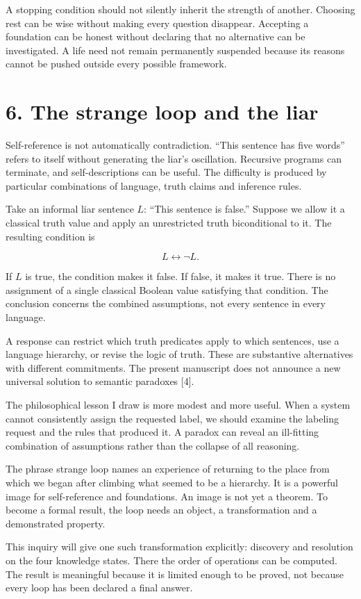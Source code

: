 \documentclass[10pt]{article}
\begin{document}
A stopping condition should not silently inherit the strength of another. Choosing rest can be wise without making every question disappear. Accepting a foundation can be honest without declaring that no alternative can be investigated. A life need not remain permanently suspended because its reasons cannot be pushed outside every possible framework.

\clearpage
\section*{6. The strange loop and the liar}
Self-reference is not automatically contradiction. ``This sentence has five words'' refers to itself without generating the liar's oscillation. Recursive programs can terminate, and self-descriptions can be useful. The difficulty is produced by particular combinations of language, truth claims and inference rules.

Take an informal liar sentence $L$: ``This sentence is false.'' Suppose we allow it a classical truth value and apply an unrestricted truth biconditional to it. The resulting condition is

\[
L\leftrightarrow\neg L.
\]

If $L$ is true, the condition makes it false. If false, it makes it true. There is no assignment of a single classical Boolean value satisfying that condition. The conclusion concerns the combined assumptions, not every sentence in every language.

A response can restrict which truth predicates apply to which sentences, use a language hierarchy, or revise the logic of truth. These are substantive alternatives with different commitments. The present manuscript does not announce a new universal solution to semantic paradoxes [4].

The philosophical lesson I draw is more modest and more useful. When a system cannot consistently assign the requested label, we should examine the labeling request and the rules that produced it. A paradox can reveal an ill-fitting combination of assumptions rather than the collapse of all reasoning.

The phrase strange loop names an experience of returning to the place from which we began after climbing what seemed to be a hierarchy. It is a powerful image for self-reference and foundations. An image is not yet a theorem. To become a formal result, the loop needs an object, a transformation and a demonstrated property.

This inquiry will give one such transformation explicitly: discovery and resolution on the four knowledge states. There the order of operations can be computed. The result is meaningful because it is limited enough to be proved, not because every loop has been declared a final answer.
\end{document}
